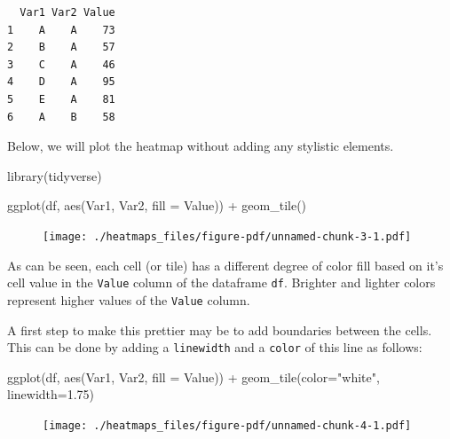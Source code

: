 \documentclass[
  letterpaper,
  DIV=11,
  numbers=noendperiod]{scrreprt}
\newenvironment{Shaded}{\begin{snugshade}}{\end{snugshade}}
\newcommand{\AttributeTok}[1]{\textcolor[rgb]{0.40,0.45,0.13}{#1}}
\newcommand{\FloatTok}[1]{\textcolor[rgb]{0.68,0.00,0.00}{#1}}
\newcommand{\FunctionTok}[1]{\textcolor[rgb]{0.28,0.35,0.67}{#1}}
\newcommand{\NormalTok}[1]{\textcolor[rgb]{0.00,0.23,0.31}{#1}}
\newcommand{\SpecialCharTok}[1]{\textcolor[rgb]{0.37,0.37,0.37}{#1}}
\newcommand{\StringTok}[1]{\textcolor[rgb]{0.13,0.47,0.30}{#1}}
\begin{document}
\begin{verbatim}
  Var1 Var2 Value
1    A    A    73
2    B    A    57
3    C    A    46
4    D    A    95
5    E    A    81
6    A    B    58
\end{verbatim}

Below, we will plot the heatmap without adding any stylistic elements.

\begin{Shaded}
\begin{Highlighting}[]
\FunctionTok{library}\NormalTok{(tidyverse)}

\FunctionTok{ggplot}\NormalTok{(df, }\FunctionTok{aes}\NormalTok{(Var1, Var2, }\AttributeTok{fill =}\NormalTok{ Value)) }\SpecialCharTok{+} 
  \FunctionTok{geom\_tile}\NormalTok{() }
\end{Highlighting}
\end{Shaded}

\begin{figure}[H]

{\centering \texttt{[image: ./heatmaps\_files/figure-pdf/unnamed-chunk-3-1.pdf]}

}

\end{figure}

As can be seen, each cell (or tile) has a different degree of color fill
based on it's cell value in the \texttt{Value} column of the dataframe
\texttt{df}. Brighter and lighter colors represent higher values of the
\texttt{Value} column.

A first step to make this prettier may be to add boundaries between the
cells. This can be done by adding a \texttt{linewidth} and a
\texttt{color} of this line as follows:

\begin{Shaded}
\begin{Highlighting}[]
\FunctionTok{ggplot}\NormalTok{(df, }\FunctionTok{aes}\NormalTok{(Var1, Var2, }\AttributeTok{fill =}\NormalTok{ Value)) }\SpecialCharTok{+} 
  \FunctionTok{geom\_tile}\NormalTok{(}\AttributeTok{color=}\StringTok{"white"}\NormalTok{, }\AttributeTok{linewidth=}\FloatTok{1.75}\NormalTok{)}
\end{Highlighting}
\end{Shaded}

\begin{figure}[H]

{\centering \texttt{[image: ./heatmaps\_files/figure-pdf/unnamed-chunk-4-1.pdf]}

}

\end{figure}
\end{document}
